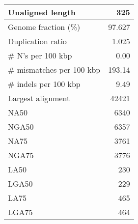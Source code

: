 \documentclass[12pt,a4paper]{article}
\begin{document}
\begin{table}[ht]
\begin{center}
\begin{tabular}{|l*{1}{|r}|}
Unaligned length & 325 \\ \hline
Genome fraction (\%) & 97.627 \\ \hline
Duplication ratio & 1.025 \\ \hline
\# N's per 100 kbp & 0.00 \\ \hline
\# mismatches per 100 kbp & 193.14 \\ \hline
\# indels per 100 kbp & 9.49 \\ \hline
Largest alignment & 42421 \\ \hline
NA50 & 6340 \\ \hline
NGA50 & 6357 \\ \hline
NA75 & 3761 \\ \hline
NGA75 & 3776 \\ \hline
LA50 & 230 \\ \hline
LGA50 & 229 \\ \hline
LA75 & 465 \\ \hline
LGA75 & 464 \\ \hline
\end{tabular}
\end{center}
\end{table}
\end{document}
